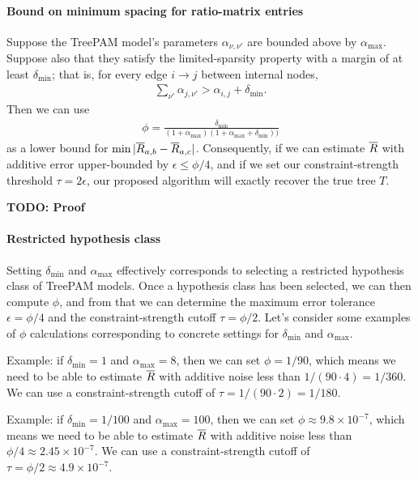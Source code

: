 \documentclass{article}
\theoremstyle{definition}
\newcommand{\deltaMin}{\delta_{\text{min}}}
\newcommand{\alphaMax}{\alpha_{\text{max}}}
\begin{document}

\paragraph{Bound on minimum spacing for ratio-matrix entries}
Suppose the TreePAM model's parameters $\alpha_{\nu,\nu'}$ are bounded above by $\alphaMax$.
Suppose also that they satisfy the limited-sparsity property with a margin of at least $\deltaMin$; that is, for every edge $i \to j$ between internal nodes,
\begin{align*}
\sum_{\nu'} \alpha_{j,\nu'} > \alpha_{i,j} + \deltaMin.
\end{align*}
Then we can use
\begin{align*}
\phi = \frac{\deltaMin}{(1+\alphaMax)(1+\alphaMax+\deltaMin))}
\end{align*}
as a lower bound for $\min |\overline{R}_{a,b} - \overline{R}_{a,c}|$.
Consequently, if we can estimate $\overline{R}$ with additive error upper-bounded by $\epsilon \leq \phi/4$, and if we set our constraint-strength threshold $\tau = 2\epsilon$, our proposed algorithm will exactly recover the true tree $T$.

{\bf TODO: Proof}


\paragraph{Restricted hypothesis class}
Setting $\deltaMin$ and $\alphaMax$ effectively corresponds to selecting a restricted hypothesis class of TreePAM models.
Once a hypothesis class has been selected, we can then compute $\phi$, and from that we can determine the maximum error tolerance $\epsilon = \phi/4$ and the constraint-strength cutoff $\tau = \phi/2$.
Let's consider some examples of $\phi$ calculations corresponding to concrete settings for $\deltaMin$ and $\alphaMax$.

Example: if $\deltaMin = 1$ and $\alphaMax = 8$, then we can set $\phi = 1/90$, which means we need to be able to estimate $\overline{R}$ with additive noise less than $1/(90 \cdot 4) = 1/360$.
We can use a constraint-strength cutoff of $\tau = 1/(90 \cdot 2) = 1/180$.

Example: if $\deltaMin = 1/100$ and $\alphaMax = 100$, then we can set $\phi \approx 9.8 \times 10^{-7}$, which means we need to be able to estimate $\overline{R}$ with additive noise less than $\phi/4 \approx 2.45 \times 10^{-7}$.
We can use a constraint-strength cutoff of $\tau = \phi/2 \approx 4.9 \times 10^{-7}$.
\end{document}
